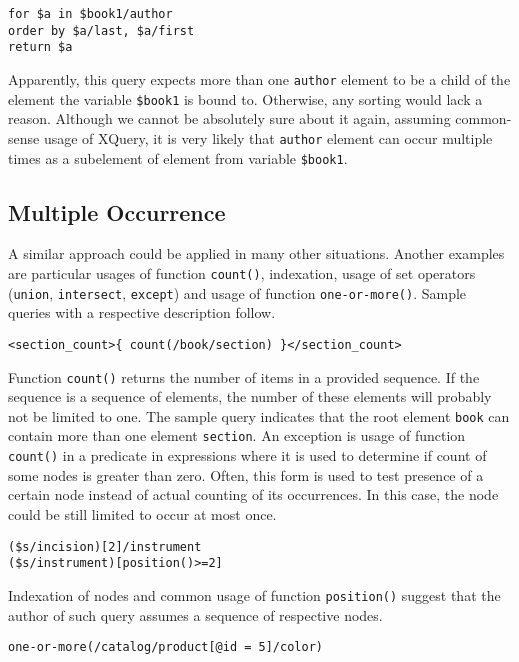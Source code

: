\begin{verbatim}
for $a in $book1/author 
order by $a/last, $a/first
return $a
\end{verbatim}

Apparently, this query expects more than one \texttt{author} element to be a child of the element the variable \texttt{\$book1} is bound to. Otherwise, any sorting would lack a reason. Although we cannot be absolutely sure about it again, assuming common-sense usage of XQuery, it is very likely that \texttt{author} element can occur multiple times as a subelement of element from variable \texttt{\$book1}.

\subsection{Multiple Occurrence}
A similar approach could be applied in many other situations. Another examples are particular usages of function \texttt{count()}, indexation, usage of set operators (\texttt{union}, \texttt{intersect}, \texttt{except}) and usage of function \texttt{one-or-more()}. Sample queries with a respective description follow.

\begin{verbatim}
<section_count>{ count(/book/section) }</section_count>
\end{verbatim}

Function \texttt{count()} returns the number of items in a provided sequence. If the sequence is a sequence of elements, the number of these elements will probably not be limited to one. The sample query indicates that the root element \texttt{book} can contain more than one element \texttt{section}.
An exception is usage of function \texttt{count()} in a predicate in expressions where it is used to determine if count of some nodes is greater than zero. Often, this form is used to test presence of a certain node instead of actual counting of its occurrences. In this case, the node could be still limited to occur at most once.

\begin{verbatim}
($s/incision)[2]/instrument
($s/instrument)[position()>=2]
\end{verbatim}

Indexation of nodes and common usage of function \texttt{position()} suggest that the author of such query assumes a sequence of respective nodes.

\begin{verbatim}
one-or-more(/catalog/product[@id = 5]/color)
\end{verbatim}

